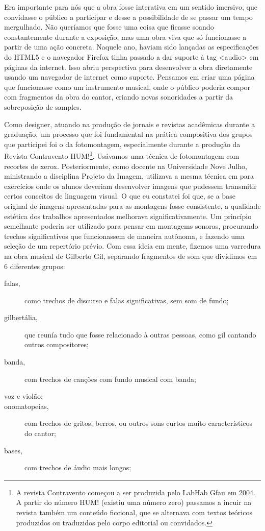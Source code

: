 Era importante para nós que a obra fosse interativa em um sentido imersivo, que convidasse o público a participar e desse a possibilidade de se passar um tempo mergulhado. Não queríamos que fosse uma coisa que ficasse soando constantemente durante a exposição, mas uma obra viva que só funcionasse a partir de uma ação concreta. Naquele ano, haviam sido lançadas as especificações do HTML5 e o navegador Firefox tinha passado a dar suporte à tag <audio> em páginas da internet. Isso abriu perspectiva para desenvolver a obra diretamente usando um navegador de internet como suporte. Pensamos em criar uma página que funcionasse como um instrumento musical, onde o público poderia compor com fragmentos da obra do cantor, criando novas sonoridades a partir da sobreposição de samples. 

Como designer, atuando na produção de jornais e revistas acadêmicas durante a graduação, um processo que foi fundamental na prática compositiva dos grupos que participei foi o da fotomontagem, especialmente durante a produção da Revista Contravento HUM!\footnote{A revista Contravento começou a ser produzida pelo LabHab Gfau em 2004. A partir do número HUM! (existiu uma número zero) passamos a incuir na revista também um conteúdo ficcional, que se alternava com  textos teóricos produzidos ou traduzidos pelo corpo editorial ou convidados.}. Usávamos uma técnica de fotomontagem com recortes de xerox. Posteriormente, como docente na Universidade Nove Julho, ministrando a disciplina Projeto da Imagem, utilizava a mesma técnica em para exercícios onde os alunos deveriam desenvolver imagens que pudessem transmitir certos conceitos de linguagem visual. O que eu constatei foi que, se a base original de imagens apresentadas para as montagens fosse consistente, a qualidade estética dos trabalhos apresentados melhorava significativamente. Um princípio semelhante poderia ser utilizado para pensar em montagems sonoras, procurando trechos significativos que funcionassem de maneira autônoma, e fazendo uma seleção de um repertório prévio. Com essa ideia em mente, fizemos uma varredura na obra musical de Gilberto Gil, separando fragmentos de som que dividimos em 6 diferentes grupos: 

\begin{description}
\item[falas,]{ como trechos de discurso e falas significativas, sem som de fundo;
}
\item[gilbertália,]{ que reunía tudo que fosse relacionado à outras pessoas, como gil cantando outros compositores;
}
\item[banda,]{ com trechos de canções com fundo musical com banda;
}
\item[voz e violão;]{}
\item[onomatopeias,]{ com trechos de gritos, berros, ou outros sons curtos muito característicos do cantor;}
\item[bases,]{ com trechos de áudio mais longos; 
}

\end{description}


